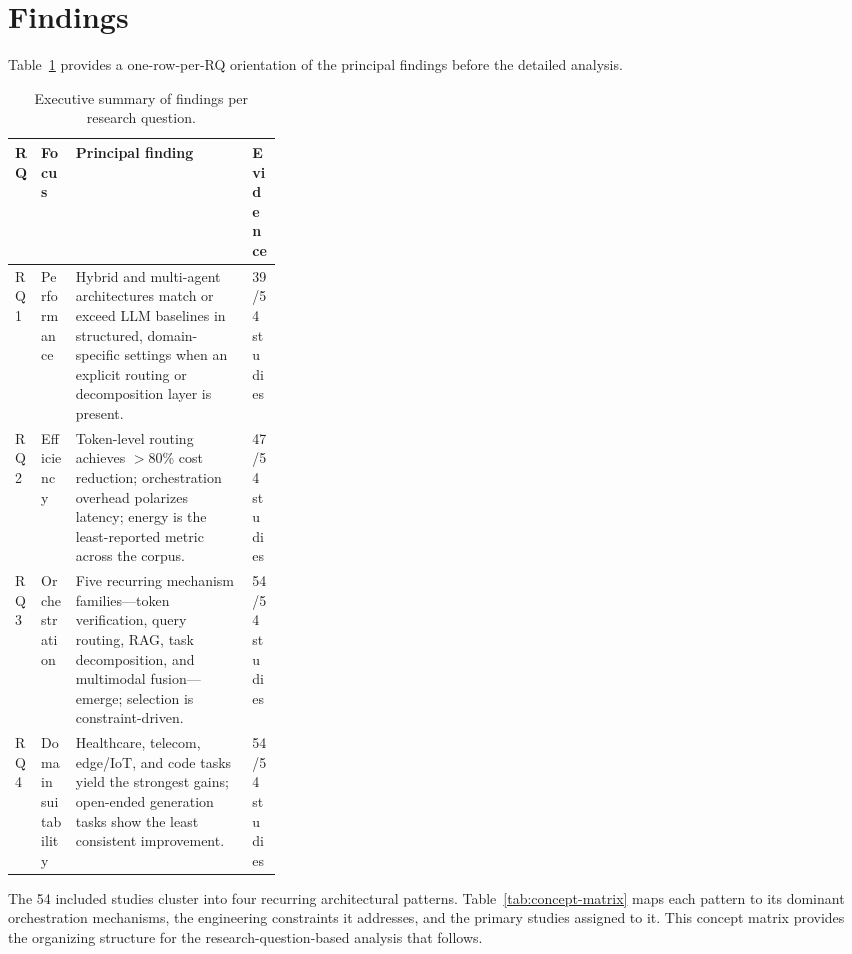 \section{Findings}
\label{sec:findings}

Table~\ref{tab:rq-summary} provides a one-row-per-RQ orientation of the principal findings before the detailed analysis.

{\footnotesize
\setlength{\tabcolsep}{3pt}
\renewcommand{\arraystretch}{1.08}
\begin{table}[!htbp]
\centering
\caption{Executive summary of findings per research question.}
\label{tab:rq-summary}
\begin{tabularx}{\linewidth}{@{} p{0.07\linewidth} p{0.13\linewidth} >{\raggedright\arraybackslash}X p{0.11\linewidth} @{}}
\toprule
\textbf{RQ} & \textbf{Focus} & \textbf{Principal finding} & \textbf{Evidence} \\
\midrule
RQ1 & Performance &
Hybrid and multi-agent architectures match or exceed LLM baselines in structured, domain-specific settings when an explicit routing or decomposition layer is present. &
39/54 studies \\
RQ2 & Efficiency &
Token-level routing achieves $>$80\% cost reduction; orchestration overhead polarizes latency; energy is the least-reported metric across the corpus. &
47/54 studies \\
RQ3 & Orchestration &
Five recurring mechanism families---token verification, query routing, RAG, task decomposition, and multimodal fusion---emerge; selection is constraint-driven. &
54/54 studies \\
RQ4 & Domain suitability &
Healthcare, telecom, edge/IoT, and code tasks yield the strongest gains; open-ended generation tasks show the least consistent improvement. &
54/54 studies \\
\bottomrule
\end{tabularx}
\end{table}
}

The 54 included studies cluster into four recurring architectural patterns. Table~\ref{tab:concept-matrix} maps each pattern to its dominant orchestration mechanisms, the engineering constraints it addresses, and the primary studies assigned to it. This concept matrix provides the organizing structure for the research-question-based analysis that follows.

